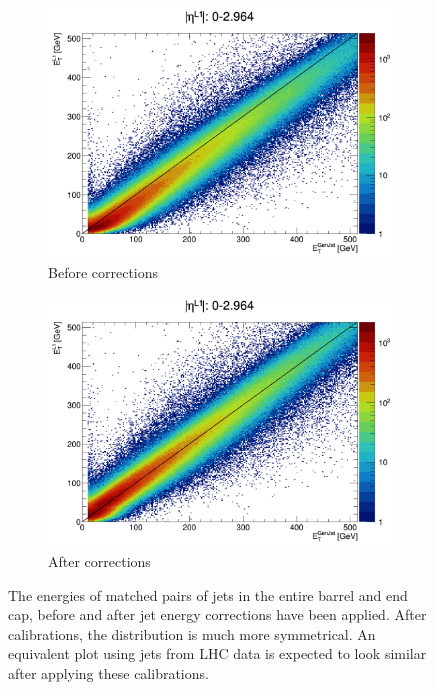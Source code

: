 \begin{figure}[htbp]
    \centering
    \begin{subfigure}[b]{0.45\textwidth}
        \includegraphics[width=\textwidth]{./figures/jecs/scatterPlotBeforeBE.png}
        \caption{Before corrections}
        \label{fig:detector_jecs_scatter_before_BE}
    \end{subfigure}
    \hfill
    \begin{subfigure}[b]{0.45\textwidth}
        \includegraphics[width=\textwidth]{./figures/jecs/scatterPlotAfterBE.png}
        \caption{After corrections}
        \label{fig:detector_jecs_scatter_after_BE}
    \end{subfigure}
\caption[The energies of matched pairs of jets in the entire barrel and end cap, before and after jet energy corrections have been applied]{The energies of matched pairs of jets in the entire barrel and end cap, before and after jet energy corrections have been applied. After calibrations, the distribution is much more symmetrical. An equivalent plot using jets from LHC data is expected to look similar after applying these calibrations.}
\label{fig:detector_jecs_scatter_BE}
\end{figure}

